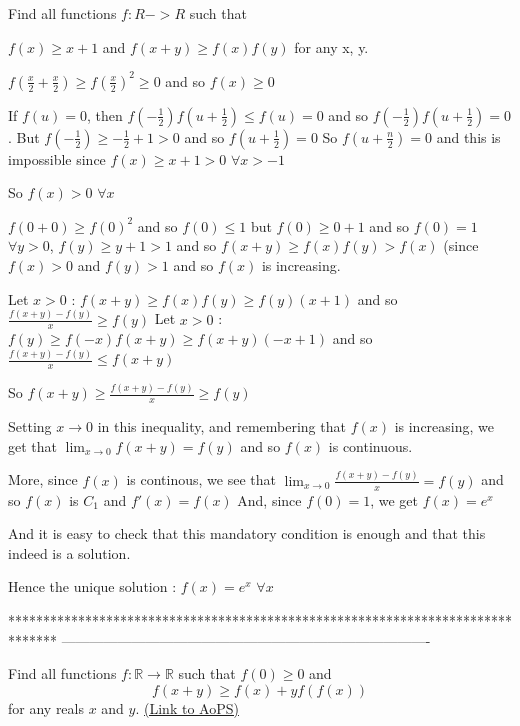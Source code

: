 \begin{solution}
	\begin{tcolorbox}Find all functions $ f: R - > R$ such that

$ f(x) \ge x + 1$ and $ f(x + y) \ge f(x)f(y)$ for any x, y.\end{tcolorbox}

$ f(\frac x2+\frac x2)\ge f(\frac x2)^2\ge 0$ and so $ f(x)\ge 0$

If $ f(u)=0$, then $ f(-\frac 12)f(u+\frac 12)\le f(u)=0$ and so $ f(-\frac 12)f(u+\frac 12)=0$. But $ f(-\frac 12)\ge -\frac 12+1>0$ and so $ f(u+\frac 12)=0$
So $ f(u+\frac n2)=0$ and this is impossible since $ f(x)\ge x+1>0$ $ \forall x>-1$

So $ f(x)>0$ $ \forall x$

$ f(0+0)\ge f(0)^2$ and so $ f(0)\le 1$ but $ f(0)\ge 0+1$ and so $ f(0)=1$
$ \forall y>0$, $ f(y)\ge y+1>1$ and so $ f(x+y)\ge f(x)f(y)>f(x)$ (since $ f(x)>0$ and $ f(y)>1$ and so $ f(x)$ is increasing.

Let $ x>0$ : $ f(x+y)\ge f(x)f(y)\ge f(y)(x+1)$ and so $ \frac{f(x+y)-f(y)}x\ge f(y)$
Let $ x>0$ : $ f(y)\ge f(-x)f(x+y)\ge f(x+y)(-x+1)$ and so $ \frac{f(x+y)-f(y)}{x}\le f(x+y)$

So $ f(x+y)\ge \frac{f(x+y)-f(y)}x\ge f(y)$

Setting $ x\to 0$ in this inequality, and remembering that $ f(x)$ is increasing, we get that $ \lim_{x\to 0}f(x+y)=f(y)$ and so $ f(x)$ is continuous.

More, since $ f(x)$ is continous, we see that $ \lim_{x\to 0}\frac{f(x+y)-f(y)}x=f(y)$ and so $ f(x)$ is $ C_1$ and $ f'(x)=f(x)$
And, since $ f(0)=1$, we get $ f(x)=e^x$

And it is easy to check that this mandatory condition is enough and that this indeed is a solution.

Hence the unique solution : $ \boxed{f(x)=e^x}$ $ \forall x$
\end{solution}
*******************************************************************************
-------------------------------------------------------------------------------

\begin{problem}
	Find all functions $f: \mathbb R \to \mathbb R$ such that $ f(0) \ge 0$ and
\[ f(x+y) \ge f(x) + yf(f(x))\]
for any reals $x$ and $y$.
	\flushright \href{https://artofproblemsolving.com/community/c6h307863}{(Link to AoPS)}
\end{problem}



